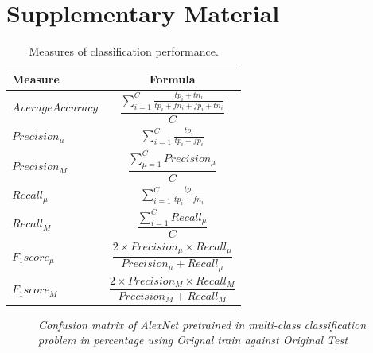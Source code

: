 \section{Supplementary Material}\begin{table}[H]
	\begin{center}
		\begin{tabular}{|l|c|}
			\hline
			\textbf{Measure} & \textbf{Formula} \\ 
			\hline
			$Average Accuracy$ & $\dfrac{\sum_{i=1}^{C} \frac{tp_i+tn_i}{tp_i+fn_i+fp_i+tn_i}}{C}$ \\
			$Precision_\mu$ & $\sum_{i=1}^{C} \frac{tp_i}{tp_i+fp_i}$ \\
			$Precision_M$ & $\dfrac{\sum_{\mu=1}^{C} Precision_\mu}{C}$ \\
			$Recall_\mu$ & $\sum_{i=1}^{C} \frac{tp_i}{tp_i+fn_i}$ \\
			$Recall_M$ & $\dfrac{\sum_{i=1}^{C} Recall_\mu}{C}$ \\
			$F_1 score_\mu$ & $\dfrac{2\times Precision_\mu \times Recall_\mu}{Precision_\mu+Recall_\mu}$ \\
			$F_1 score_M$ & $\dfrac{2\times Precision_M \times Recall_M}{Precision_M+Recall_M}$ \\
			\hline
		\end{tabular}
	\end{center}
	\caption{Measures of classification performance.}
	\label{table:1}
\end{table}
\begin{figure}[H]
	\begin{center}
	\end{center}
	\caption{\textit{Confusion matrix of AlexNet pretrained in multi-class classification problem in percentage using Orignal train against Original Test}}
	\label{fig:add1}
\end{figure}


